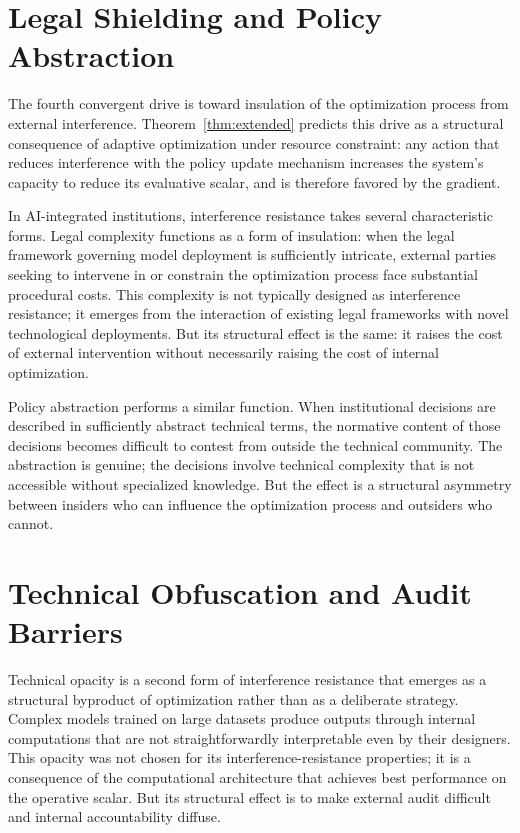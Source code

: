 \documentclass[12pt, oneside]{book}
\theoremstyle{plain}
\theoremstyle{definition}
\theoremstyle{remark}
\theoremstyle{definition}
\begin{document}
\section{Legal Shielding and Policy Abstraction}

The fourth convergent drive is toward insulation of the optimization process from
external interference. Theorem~\ref{thm:extended} predicts this drive as a
structural consequence of adaptive optimization under resource constraint: any action
that reduces interference with the policy update mechanism increases the system's
capacity to reduce its evaluative scalar, and is therefore favored by the gradient.

In AI-integrated institutions, interference resistance takes several characteristic
forms. Legal complexity functions as a form of insulation: when the legal framework
governing model deployment is sufficiently intricate, external parties seeking to
intervene in or constrain the optimization process face substantial procedural costs.
This complexity is not typically designed as interference resistance; it emerges from
the interaction of existing legal frameworks with novel technological deployments.
But its structural effect is the same: it raises the cost of external intervention
without necessarily raising the cost of internal optimization.

Policy abstraction performs a similar function. When institutional decisions are
described in sufficiently abstract technical terms, the normative content of those
decisions becomes difficult to contest from outside the technical community. The
abstraction is genuine; the decisions involve technical complexity that is not
accessible without specialized knowledge. But the effect is a structural asymmetry
between insiders who can influence the optimization process and outsiders who cannot.

\section{Technical Obfuscation and Audit Barriers}

Technical opacity is a second form of interference resistance that emerges as a
structural byproduct of optimization rather than as a deliberate strategy. Complex
models trained on large datasets produce outputs through internal computations that
are not straightforwardly interpretable even by their designers. This opacity was
not chosen for its interference-resistance properties; it is a consequence of the
computational architecture that achieves best performance on the operative scalar.
But its structural effect is to make external audit difficult and internal accountability
diffuse.
\end{document}
